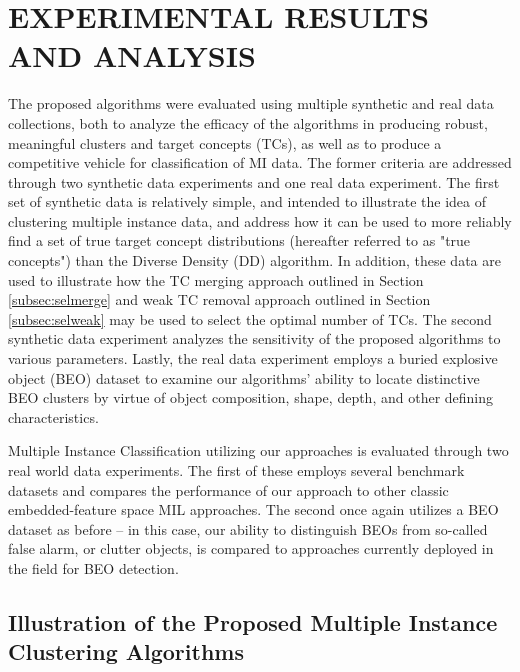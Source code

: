 \documentclass[12pt,dvips]{report}
\numberwithin{equation}{section}
\begin{document}

\clearpage

\chapter{EXPERIMENTAL RESULTS AND ANALYSIS} \label{chapter:ExperimentalResults}
The proposed algorithms were evaluated using multiple synthetic and real data collections, both to analyze the efficacy of the algorithms in producing robust, meaningful clusters and target concepts (TCs), as well as to produce a competitive vehicle for classification of MI data.  The former criteria are addressed through two synthetic data experiments and one real data experiment.  The first set of synthetic data is relatively simple, and intended to illustrate the idea of clustering multiple instance data, and address how it can be used to more reliably find a set of true target concept distributions (hereafter referred to as "true concepts") than the Diverse Density (DD) \cite{maro98} algorithm.  In addition, these data are used to illustrate how the TC merging approach outlined in Section \ref{subsec:selmerge} and weak TC removal approach outlined in Section \ref{subsec:selweak} may be used to select the optimal number of TCs.  The second synthetic data experiment analyzes the sensitivity of the proposed algorithms to various parameters.   Lastly, the real data experiment employs a buried explosive object (BEO) dataset to examine our algorithms' ability to locate distinctive BEO clusters by virtue of object composition, shape, depth, and other defining characteristics.

Multiple Instance Classification utilizing our approaches is evaluated through two real world data experiments.  The first of these employs several benchmark datasets and compares the performance of our approach to other classic embedded-feature space MIL approaches.  The second once again utilizes a BEO dataset as before -- in this case, our ability to distinguish BEOs from so-called false alarm, or clutter objects, is compared to approaches currently deployed in the field for BEO detection.

\section{Illustration of the Proposed Multiple Instance Clustering Algorithms} \label{section:Synth1}
\end{document}
